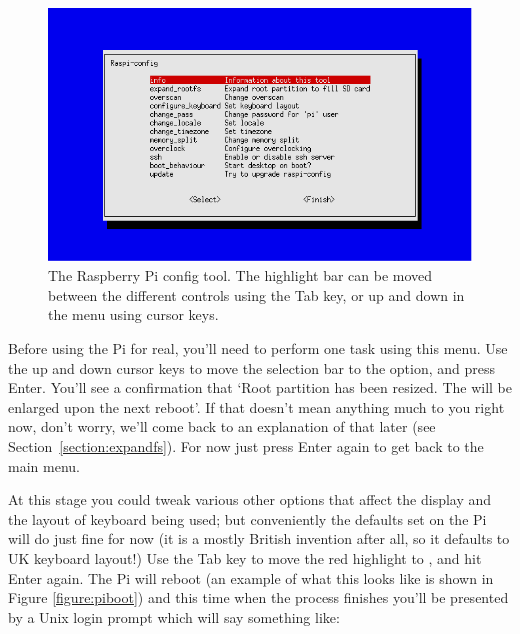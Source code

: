 \begin{figure}
\centerline{\includegraphics[width=13cm]{images/raspi-config.png}}
\caption{The Raspberry Pi config tool. The highlight bar can be moved between the different controls using the Tab key, or up and down in the menu using cursor keys.}\label{figure:raspi-config}
\end{figure}

Before using the Pi for real, you'll need to perform one task using this menu. Use the up and down cursor keys to move the selection bar to the  option, and press Enter. You'll see a confirmation that `Root partition has been resized. The  will be enlarged upon the next reboot'. If that doesn't mean anything much to you right now, don't worry, we'll come back to an explanation of that later (see Section~\ref{section:expandfs}). For now just press Enter again to get back to the main menu. 

At this stage you could tweak various other options that affect the display and the layout of keyboard being used; but conveniently the defaults set on the Pi will do just fine for now (it is a mostly British invention after all, so it defaults to UK keyboard layout!) Use the Tab key to move the red highlight to , and hit Enter again. The Pi will reboot (an example of what this looks like is shown in Figure \ref{figure:piboot}) and this time when the process finishes you'll be presented by a Unix login prompt which will say something like:

